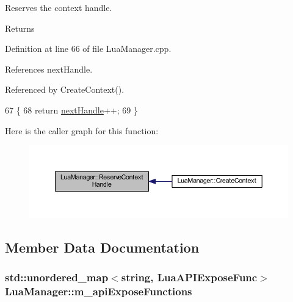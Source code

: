Reserves the context handle. 

\begin{DoxyReturn}{Returns}

\end{DoxyReturn}


Definition at line 66 of file Lua\+Manager.\+cpp.



References next\+Handle.



Referenced by Create\+Context().


\begin{DoxyCode}
67 \{
68   \textcolor{keywordflow}{return} \hyperlink{class_lua_manager_a62ecf686a07cbe20f7976e9b29ea4daa}{nextHandle}++;
69 \}
\end{DoxyCode}


Here is the caller graph for this function\+:
\nopagebreak
\begin{figure}[H]
\begin{center}
\leavevmode
\includegraphics[width=350pt]{class_lua_manager_a0e01a877be1de2604b4f9cd8ce9f4ac4_icgraph}
\end{center}
\end{figure}




\subsection{Member Data Documentation}
\subsubsection[{\texorpdfstring{m\+\_\+api\+Expose\+Functions}{m_apiExposeFunctions}}]{\setlength{\rightskip}{0pt plus 5cm}std\+::unordered\+\_\+map$<${\bf string}, {\bf Lua\+A\+P\+I\+Expose\+Func}$>$ Lua\+Manager\+::m\+\_\+api\+Expose\+Functions\hspace{0.3cm}{\ttfamily [private]}}\hypertarget{class_lua_manager_a4c7e50cd257b5c5317ca29763cdbd182}{}\label{class_lua_manager_a4c7e50cd257b5c5317ca29763cdbd182}


